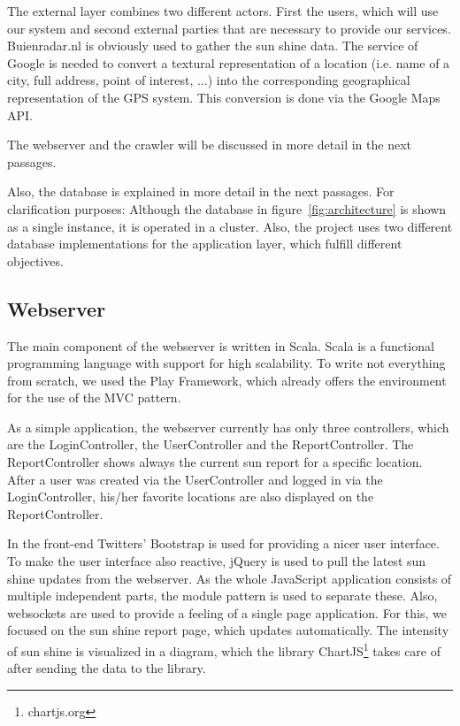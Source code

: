\documentclass[a4paper]{article}
\begin{document}
The external layer combines two different actors. First the users, which will use our system and second external parties that are necessary to provide our services. Buienradar.nl is obviously used to gather the sun shine data. The service of Google is needed to convert a textural representation of a location (i.e. name of a city, full address, point of interest, ...) into the corresponding geographical representation of the GPS system. This conversion is done via the Google Maps API.

The webserver and the crawler will be discussed in more detail in the next passages.

Also, the database is explained in more detail in the next passages. For clarification purposes: Although the database in figure~\ref{fig:architecture} is shown as a single instance, it is operated in a cluster. Also, the project uses two different database implementations for the application layer, which fulfill different objectives.

\subsection{Webserver}
The main component of the webserver is written in Scala. Scala is a functional programming language with support for high scalability. To write not everything from scratch, we used the Play Framework, which already offers the environment for the use of the MVC pattern.

As a simple application, the webserver currently has only three controllers, which are the LoginController, the UserController and the ReportController. The ReportController shows always the current sun report for a specific location. After a user was created via the UserController and logged in via the LoginController, his/her favorite locations are also displayed on the ReportController.

In the front-end Twitters' Bootstrap is used for providing a nicer user interface. To make the user interface also reactive, jQuery is used to pull the latest sun shine updates from the webserver. As the whole JavaScript application consists of multiple independent parts, the module pattern is used to separate these. Also, websockets are used to provide a feeling of a single page application. For this, we focused on the sun shine report page, which updates automatically. The intensity of sun shine is visualized in a diagram, which the library ChartJS\footnote{chartjs.org} takes care of after sending the data to the library.
\end{document}

